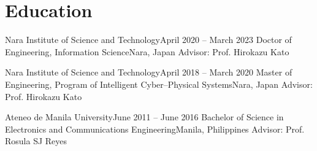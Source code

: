 \section{Education}
\cvSubHeadingListStart

\cvSubheading
{Nara Institute of Science and Technology}{April 2020 -- March 2023}
{Doctor of Engineering, Information Science}{Nara, Japan}
\cvSubSubheading
{Advisor: Prof. Hirokazu Kato}{}

\vspace{-2pt}
\cvItemListStart
{}
\cvItemListEnd

\cvSubheading
{Nara Institute of Science and Technology}{April 2018 -- March 2020}
{Master of Engineering, Program of Intelligent Cyber--Physical Systems}{Nara, Japan}
\cvSubSubheading
{Advisor: Prof. Hirokazu Kato}{}

\vspace{-2pt}
\cvItemListStart
{}
\cvItemListEnd

\cvSubheading
{Ateneo de Manila University}{June 2011 -- June 2016}
{Bachelor of Science in Electronics and Communications Engineering}{Manila, Philippines}
\cvSubSubheading
{Advisor: Prof. Rosula SJ Reyes}{}

\cvItemListStart
{}
\cvItemListEnd

\cvSubHeadingListEnd
